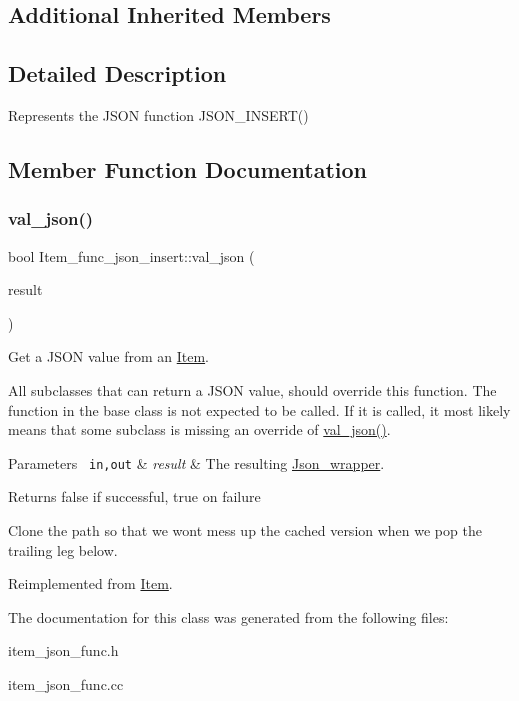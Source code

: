 \subsection*{Additional Inherited Members}


\subsection{Detailed Description}
Represents the J\+S\+ON function J\+S\+O\+N\+\_\+\+I\+N\+S\+E\+R\+T() 

\subsection{Member Function Documentation}
\mbox{\label{classItem__func__json__insert_a45b5b362fcea87f93083500e8c805609}} 
\subsubsection{\texorpdfstring{val\+\_\+json()}{val\_json()}}
{\footnotesize\ttfamily bool Item\+\_\+func\+\_\+json\+\_\+insert\+::val\+\_\+json (\begin{DoxyParamCaption}\item[{\mbox{\hyperlink{classJson__wrapper}{Json\+\_\+wrapper}} $\ast$}]{result }\end{DoxyParamCaption})\hspace{0.3cm}{\ttfamily [virtual]}}

Get a J\+S\+ON value from an \mbox{\hyperlink{classItem}{Item}}.

All subclasses that can return a J\+S\+ON value, should override this function. The function in the base class is not expected to be called. If it is called, it most likely means that some subclass is missing an override of \mbox{\hyperlink{classItem__func__json__insert_a45b5b362fcea87f93083500e8c805609}{val\+\_\+json()}}.


\begin{DoxyParams}[1]{Parameters}
\mbox{\texttt{ in,out}}  & {\em result} & The resulting \mbox{\hyperlink{classJson__wrapper}{Json\+\_\+wrapper}}.\\
\hline
\end{DoxyParams}
\begin{DoxyReturn}{Returns}
false if successful, true on failure 
\end{DoxyReturn}
Clone the path so that we won\textquotesingle{}t mess up the cached version when we pop the trailing leg below.

Reimplemented from \mbox{\hyperlink{classItem_a57e763fcde2d0a819d21e31c59611290}{Item}}.



The documentation for this class was generated from the following files\+:\begin{DoxyCompactItemize}
\item 
item\+\_\+json\+\_\+func.\+h\item 
item\+\_\+json\+\_\+func.\+cc\end{DoxyCompactItemize}
